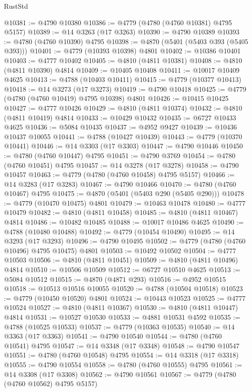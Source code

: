 \begin{lexlean}{RustStd}
\begin{coremodule}
@10381 := @4790 @10380
@10386 := @4779 (@4780 (@4760 @10381) @4795 @5157)
@10389 := @14 @3263 (@17 @3263)
@10390 := @4790 @10389
@10393 := @4780 (@4760 @10390) @4795
@10398 := @4870 (@5401 (@5403 @393 (@5405 @393)))
@10401 := @4779 (@10393 @10398) @4801
@10402 := @10386 @10401
@10403 := @4777 @10402
@10405 := @4810 (@4811 @10381)
@10408 := @4810 (@4811 @10390) @4814
@10409 := @10405 @10408
@10411 := @10017 @10409 @4625
@10413 := @4788 (@10403 @10411)
@10415 := @4779 (@10377 @10413)
@10418 := @14 @3273 (@17 @3273)
@10419 := @4790 @10418
@10425 := @4779 (@4780 (@4760 @10419) @4795 @10398) @4801
@10426 := @10415 @10425
@10427 := @4777 @10426
@10429 := @4810 (@4811 @10374)
@10432 := @4810 (@4811 @10419) @4814
@10433 := @10429 @10432
@10435 := @6727 @10433 @4625
@10436 := @5084 @10435
@10437 := @4952 @9427
@10439 := @10436 @10437 @10055
@10441 := @4788 (@10427 @10439)
@10443 := @4779 (@10370 @10441)
@10446 := @14 @3303 (@17 @3303)
@10447 := @4790 @10446
@10450 := @4780 (@4760 @10447) @4795
@10451 := @4790 @3769
@10454 := @4780 (@4760 @10451) @4795
@10457 := @14 @3278 (@17 @3278)
@10458 := @4790 @10457
@10463 := @4779 (@4780 (@4760 @10458) @4795 @5157)
@10466 := @14 @3283 (@17 @3283)
@10467 := @4790 @10466
@10470 := @4780 (@4760 @10467) @4795
@10475 := @4870 (@5401 (@5403 @290 (@5405 @290)))
@10478 := @4779 (@10470 @10475) @4801
@10479 := @10463 @10478
@10480 := @4777 @10479
@10482 := @4810 (@4811 @10458)
@10485 := @4810 (@4811 @10467) @4814
@10486 := @10482 @10485
@10488 := @10017 @10486 @4625
@10490 := @4788 (@10480 @10488)
@10492 := @4779 (@10454 @10490)
@10495 := @14 @3293 (@17 @3293)
@10496 := @4790 @10495
@10502 := @4779 (@4780 (@4760 @10496) @4795 @10475) @4801
@10503 := @10492 @10502
@10504 := @4777 @10503
@10506 := @4810 (@4811 @10451)
@10509 := @4810 (@4811 @10496) @4814
@10510 := @10506 @10509
@10512 := @6727 @10510 @4625
@10513 := @5084 @10512
@10515 := @4870 (@4871 @293)
@10516 := @4952 @10515
@10518 := @10513 @10516 @10055
@10520 := @4788 (@10504 @10518)
@10523 := @4779 (@10450 @10520) @4801
@10524 := @10443 @10523
@10525 := @4777 @10524
@10527 := @4810 (@4811 @10367)
@10530 := @4810 (@4811 @10447) @4814
@10531 := @10527 @10530
@10533 := @4881 @10531 @4592
@10535 := @4788 (@10525 @10533)
@10537 := @4779 (@10363 @10535)
@10540 := @14 @3363 (@17 @3363)
@10541 := @4790 @10540
@10544 := @4780 (@4760 @10541) @4795
@10547 := @14 @3348 (@17 @3348)
@10548 := @4790 @10547
@10551 := @4780 (@4760 @10548) @4795
@10554 := @14 @3318 (@17 @3318)
@10555 := @4790 @10554
@10558 := @4780 (@4760 @10555) @4795
@10561 := @14 @3308 (@17 @3308)
@10562 := @4790 @10561
@10567 := @4779 (@4780 (@4760 @10562) @4795 @5157)

\end{coremodule}
\end{lexlean}

